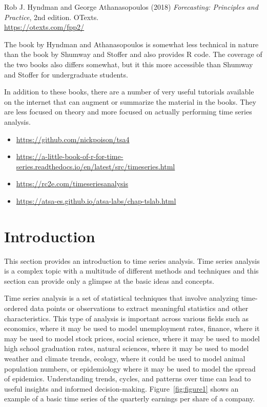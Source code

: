 \begin{tcolorbox}[colback=alert]
Rob J. Hyndman and George Athanasopoulos (2018) \emph{Forecasting: Principles and Practice}, 2nd edition. OTexts. \\

\vspace{.5\baselineskip}
\url{https://otexts.com/fpp2/} 
\end{tcolorbox}

The book by Hyndman and Athanasopoulos is somewhat less technical in nature than the book by Shumway and Stoffer and also provides R code. The coverage of the two books also differs somewhat, but it this more accessible than Shumway and Stoffer for undergraduate students.

In addition to these books, there are a number of very useful tutorials available on the internet that can augment or summarize the material in the books. They are less focused on theory and more focused on actually performing time series analysis.

\begin{tcolorbox}[colback=alert]
\begin{itemize}
\item \url{https://github.com/nickpoison/tsa4}
\item \url{https://a-little-book-of-r-for-time-series.readthedocs.io/en/latest/src/timeseries.html}
\item \url{https://rc2e.com/timeseriesanalysis}
\item \url{https://atsa-es.github.io/atsa-labs/chap-tslab.html}
\end{itemize}
\end{tcolorbox}

\section{Introduction}

This section provides an introduction to time series analysis. Time series analysis is a complex topic with a multitude of different methods and techniques and this section can provide only a glimpse at the basic ideas and concepts. 

Time series analysis is a set of statistical techniques that involve analyzing time-ordered data points or observations to extract meaningful statistics and other characteristics. This type of analysis is important across various fields such as economics, where it may be used to model unemployment rates, finance, where it may be used to model stock prices, social science, where it may be used to model high school graduation rates, natural sciences, where it may be used to model weather and climate trends, ecology, where it could be used to model animal population numbers, or epidemiology where it may be used to model the spread of epidemics. Understanding trends, cycles, and patterns over time can lead to useful insights and informed decision-making. Figure~\ref{fig:figure1} shows an example of a basic time series of the quarterly earnings per share of a company.

